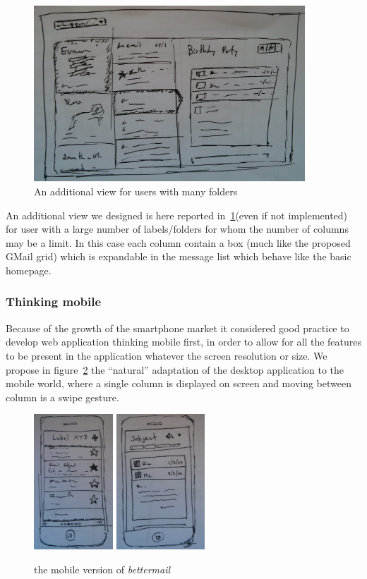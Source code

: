 \documentclass[a4paper,12pt]{report}
\begin{document}
\begin{figure}[H]
  \centering
  \includegraphics[width=4in]{new_3_cols}
  \caption{An additional view for users with many folders}
  \label{fig:new3}
\end{figure}
An additional view we designed is here reported in~\ref{fig:new3}(even if not implemented) for user with a large number of labels/folders for whom the number of columns may be a limit. In this case each column contain a box (much like the proposed GMail grid) which is expandable in the message list which behave like the basic homepage.

\subsubsection{Thinking mobile}
Because of the growth of the smartphone market it considered good practice to develop web application thinking mobile first, in order to allow for all the features to be present in the application whatever the screen resolution or size. We propose in figure~\ref{fig:mobile} the ``natural'' adaptation of the desktop application to the mobile world, where a single column is displayed on screen and moving between column is a swipe gesture.
\begin{figure}[H]
  \centering
  \includegraphics[height=2in]{list}
  \includegraphics[height=2in]{email}
  \caption{the mobile version of \emph{bettermail}}
  \label{fig:mobile}
\end{figure}
\end{document}
